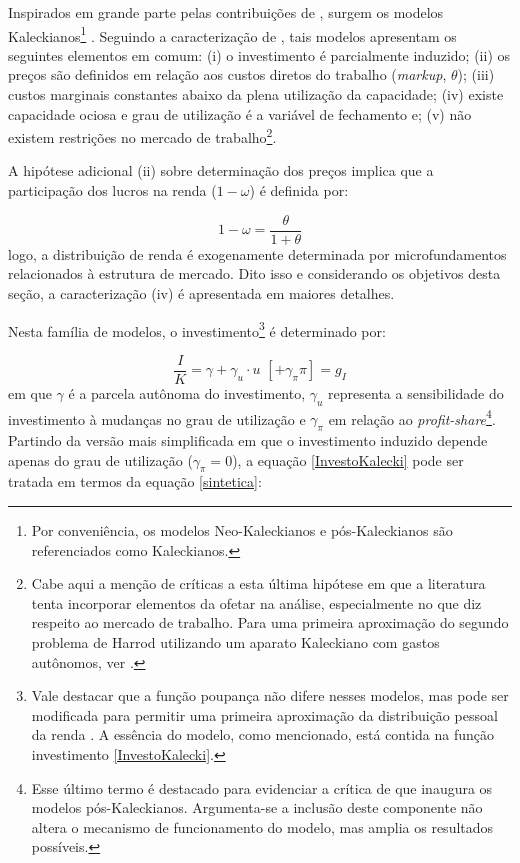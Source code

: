 Inspirados em grande parte pelas contribuições de \textcite{steindl_stagnation_1979}, surgem os modelos Kaleckianos\footnote{Por conveniência, os modelos Neo-Kaleckianos e pós-Kaleckianos são referenciados como Kaleckianos.} \cites{rowthorn_demand_1981}{dutt_stagnation_1984}{taylor_stagnationist_1985}{amadeo_role_1986}{bhaduri_unemployment_1990}. Seguindo a caracterização de \textcite[p.~790]{lavoie_kaleckian_1995}, tais modelos apresentam os seguintes elementos em comum: (i) o investimento é parcialmente induzido; (ii) os preços são definidos em relação aos custos diretos do trabalho (\textit{markup}, $\theta$); (iii) custos marginais constantes abaixo da plena utilização da capacidade; (iv) existe capacidade ociosa e grau de utilização é a variável de fechamento e; (v) não existem restrições no mercado de trabalho\footnote{Cabe aqui a menção de críticas a esta última hipótese em que a literatura tenta incorporar elementos da ofetar na análise, especialmente no que diz respeito ao mercado de trabalho. Para uma primeira aproximação do segundo problema de Harrod utilizando um aparato Kaleckiano com gastos autônomos, ver \textcite{allain_demographic_2018}.}. 

A hipótese adicional (ii) sobre determinação dos preços implica que a participação dos lucros na renda ($1-\omega$) é definida por:

$$
1- \omega = \frac{\theta}{1+\theta}
$$
logo, a distribuição de renda é exogenamente determinada por microfundamentos relacionados à estrutura de mercado. Dito isso e considerando os objetivos desta seção, a caracterização (iv) é apresentada em maiores detalhes.

Nesta família de modelos, o investimento\footnote{Vale destacar que a função poupança não difere nesses modelos, mas pode ser modificada para permitir uma primeira aproximação  da distribuição pessoal da renda \cites{carvalho_personal_2016}{palley_wage-_2017}. A essência do modelo, como mencionado, está contida na função investimento \ref{InvestoKalecki}.} é determinado por:

\begin{equation}
    \label{InvestoKalecki}
    \frac{I}{K} = \gamma + \gamma_u\cdot u \,\,[+ \gamma_{\pi}\pi] = g_I
\end{equation}
em que $\gamma$ é a parcela autônoma do investimento, $\gamma_u$ representa a sensibilidade do investimento à mudanças no grau de utilização e $\gamma_{\pi}$ em relação ao \textit{profit-share}\footnote{Esse último termo é destacado para evidenciar a crítica de \textcite{bhaduri_unemployment_1990} que inaugura os modelos pós-Kaleckianos. Argumenta-se a inclusão deste componente não altera o mecanismo de funcionamento do modelo, mas amplia os resultados possíveis.}. Partindo da versão mais simplificada em que o investimento induzido depende apenas do grau de utilização ($\gamma_{\pi} = 0$),  a equação \ref{InvestoKalecki} pode ser tratada em termos da equação \ref{sintetica}:


